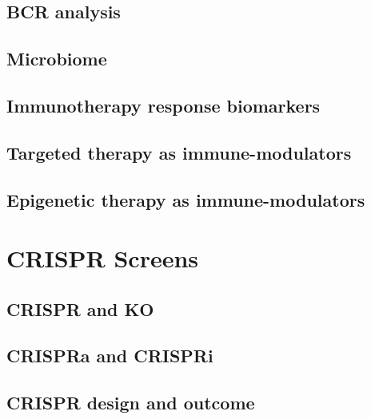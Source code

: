 \documentclass[
]{book}
\begin{document}
\hypertarget{bcr-analysis}{%
\section{BCR analysis}\label{bcr-analysis}}

\hypertarget{microbiome}{%
\section{Microbiome}\label{microbiome}}

\hypertarget{immunotherapy-response-biomarkers}{%
\section{Immunotherapy response biomarkers}\label{immunotherapy-response-biomarkers}}

\hypertarget{targeted-therapy-as-immune-modulators}{%
\section{Targeted therapy as immune-modulators}\label{targeted-therapy-as-immune-modulators}}

\hypertarget{epigenetic-therapy-as-immune-modulators}{%
\section{Epigenetic therapy as immune-modulators}\label{epigenetic-therapy-as-immune-modulators}}

\hypertarget{crispr}{%
\chapter{CRISPR Screens}\label{crispr}}

\hypertarget{crispr-and-ko}{%
\section{CRISPR and KO}\label{crispr-and-ko}}

\hypertarget{crispra-and-crispri}{%
\section{CRISPRa and CRISPRi}\label{crispra-and-crispri}}

\hypertarget{crispr-design-and-outcome}{%
\section{CRISPR design and outcome}\label{crispr-design-and-outcome}}
\end{document}
